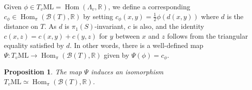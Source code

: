 \documentclass{amsart}
\newtheorem{proposition}{Proposition}
\newcommand{\R}{\mathbb{R}}
\newcommand{\ML}{\mathrm{ML}}
\newcommand{\Bb}{\mathcal{B}}
\DeclareMathOperator{\Hom}{Hom}
\begin{document}

Given $\phi\in T_v \ML=\Hom(\Lambda_v,\R)$, we define a corresponding $c_\phi\in \Hom_\pi(\Bb(T),\R)$ by setting $c_{\phi}(x,y)=\frac{1}{2}\phi(d(x,y))$ where $d$ is the distance on $T$. As $d$ is $\pi_1(S)$-invariant, $c$ is also, and the identity $c(x,z)=c(x,y)+c(y,z)$ for $y$ between $x$ and $z$ follows from the triangular equality satisfied by $d$. In other words, there is a well-defined map $\Psi:T_v\ML\to \Hom_\pi(\Bb(T),\R)$ given by $\Psi(\phi)=c_\phi$. 

\begin{proposition}\label{iso1}
The map $\Psi$ induces an isomorphism $T_v\ML\simeq \Hom_\pi(\Bb(T),\R)$. 
\end{proposition}
\end{document}
